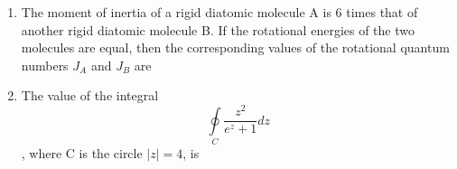 \documentclass[journal,12pt,onecolumn]{IEEEtran}
\theoremstyle{remark}
\begin{document}
\begin{enumerate}
\item The moment of inertia of a rigid diatomic molecule A is 6 times that of another rigid diatomic molecule B. If the rotational energies of the two molecules are equal, then the corresponding values of the rotational quantum numbers $J_A$ and $J_B$ are
\hfill{} \begin{enumerate}  \end{enumerate}

\item The value of the integral $$\oint\limits_C \frac{z^2}{e^z+1} dz$$, where C is the circle $|z|=4$, is
\hfill{} \begin{enumerate}  \end{enumerate}


\end{enumerate}
\end{document}
